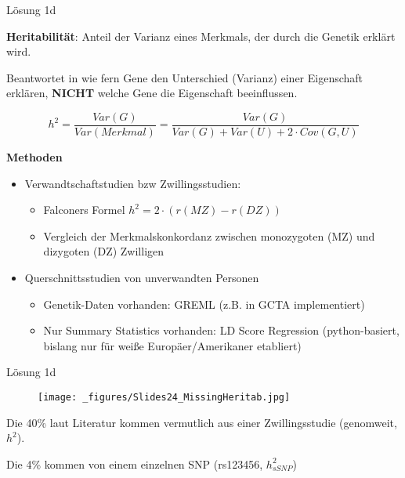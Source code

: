 \documentclass{beamer}
\begin{document}
\begin{frame}{Lösung 1d}

\textbf{Heritabilität}: Anteil der Varianz eines Merkmals, der durch die Genetik erklärt wird. 

Beantwortet in wie fern Gene den Unterschied (Varianz) einer Eigenschaft erklären, \textbf{NICHT} welche Gene die Eigenschaft beeinflussen. 

$$ h^2 = \frac{Var(G)}{Var(Merkmal)} = \frac{Var(G)}{Var(G) + Var(U) + 2 \cdot Cov(G, U)}$$

\textbf{Methoden}

\begin{itemize}
    \item Verwandtschaftstudien bzw Zwillingsstudien:
    \begin{itemize}
        \item Falconers Formel $h^2=2 \cdot (r(MZ) - r(DZ))$ 
        \item Vergleich der Merkmalskonkordanz zwischen monozygoten (MZ) und dizygoten (DZ) Zwilligen
    \end{itemize}
    \item Querschnittsstudien von unverwandten Personen
    \begin{itemize}
        \item Genetik-Daten vorhanden: GREML (z.B. in GCTA implementiert)
        \item Nur Summary Statistics vorhanden: LD Score Regression (python-basiert, bislang nur für weiße Europäer/Amerikaner etabliert)
    \end{itemize}
\end{itemize}

\end{frame}

\begin{frame}{Lösung 1d}

\begin{figure}[h]
\begin{center}
\texttt{[image: \_figures/Slides24\_MissingHeritab.jpg]}
\label{fig:Heritab}
\end{center}
\end{figure}

Die 40\% laut Literatur kommen vermutlich aus einer Zwillingsstudie (genomweit, $h^2$).

Die 4\% kommen von einem einzelnen SNP (rs123456, $h_{sSNP}^2$)

\end{frame}
\end{document}
